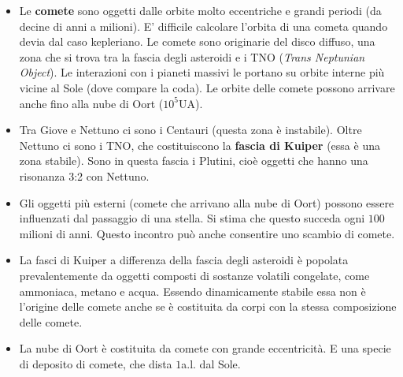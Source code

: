 \documentclass[11pt,a4paper]{article}
\begin{document}
\begin{itemize}
\item Le \textbf{comete} sono oggetti dalle orbite molto eccentriche e grandi periodi (da decine di anni a milioni). E' difficile calcolare l'orbita di una cometa quando devia dal caso kepleriano. Le comete sono originarie del disco diffuso, una zona che si trova tra la fascia degli asteroidi e i TNO (\textit{Trans Neptunian Object}). Le interazioni con i pianeti massivi le portano su orbite interne più vicine al Sole (dove compare la coda). Le orbite delle comete possono arrivare anche fino alla nube di Oort ($10^5$UA).

\item Tra Giove e Nettuno ci sono i Centauri (questa zona è instabile). Oltre Nettuno ci sono i TNO, che costituiscono la \textbf{fascia di Kuiper}  (essa è una zona stabile). Sono in questa fascia i Plutini, cioè oggetti che hanno una risonanza 3:2 con Nettuno.

\item Gli oggetti più esterni (comete che arrivano alla nube di Oort) possono essere influenzati dal passaggio di una stella. Si stima che questo succeda ogni $100$ milioni di anni. Questo incontro può anche consentire uno scambio di comete.

\item La fasci di Kuiper a differenza della fascia degli asteroidi è popolata prevalentemente da oggetti composti di sostanze volatili congelate, come ammoniaca, metano e acqua. Essendo dinamicamente stabile essa non è l'origine delle comete anche se è costituita da corpi con la stessa composizione delle comete.

\item La nube di Oort è costituita da comete con grande eccentricità. E una specie di deposito di comete, che dista $1$a.l. dal Sole.
\end{itemize}
\end{document}
